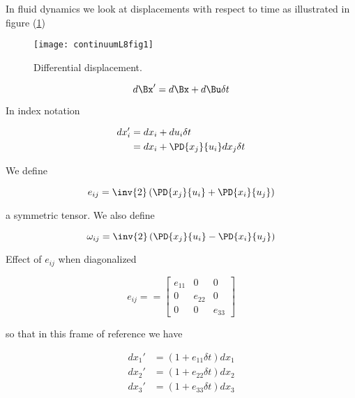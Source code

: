 
In fluid dynamics we look at displacements with respect to time as illustrated in figure (\ref{fig:continuumL8:continuumL8fig1})
\begin{figure}[htp]
   \centering
   \texttt{[image: continuumL8fig1]}
   \caption{Differential displacement.}\label{fig:continuumL8:continuumL8fig1}
\end{figure}

\begin{equation}\label{eqn:continuumL8:230}
d\Bx' = d\Bx + d\Bu \delta t
\end{equation}

In index notation

\begin{align*}
dx_i'
&= dx_i + du_i \delta t \\
&= dx_i + \PD{x_j}{u_i} dx_j \delta t
\end{align*}

We define

\begin{equation}\label{eqn:continuumL8:250}
e_{ij} = \inv{2} \left(
\PD{x_j}{u_i} +
\PD{x_i}{u_j} \right)
\end{equation}

a symmetric tensor.  We also define

\begin{equation}\label{eqn:continuumL8:270}
\omega_{ij} = \inv{2} \left(
\PD{x_j}{u_i}
-\PD{x_i}{u_j} \right)
\end{equation}

Effect of $e_{ij}$ when diagonalized

\begin{equation}\label{eqn:continuumL8:290}
e_{ij} =
=
\begin{bmatrix}
e_{11} & 0 & 0 \\
0 & e_{22} & 0 \\
0 & 0 & e_{33}
\end{bmatrix}
\end{equation}

so that in this frame of reference we have

\begin{align}\label{eqn:continuumL8:310}
dx_1' &= ( 1 + e_{11} \delta t) dx_1 \\
dx_2' &= ( 1 + e_{22} \delta t) dx_2 \\
dx_3' &= ( 1 + e_{33} \delta t) dx_3
\end{align}

